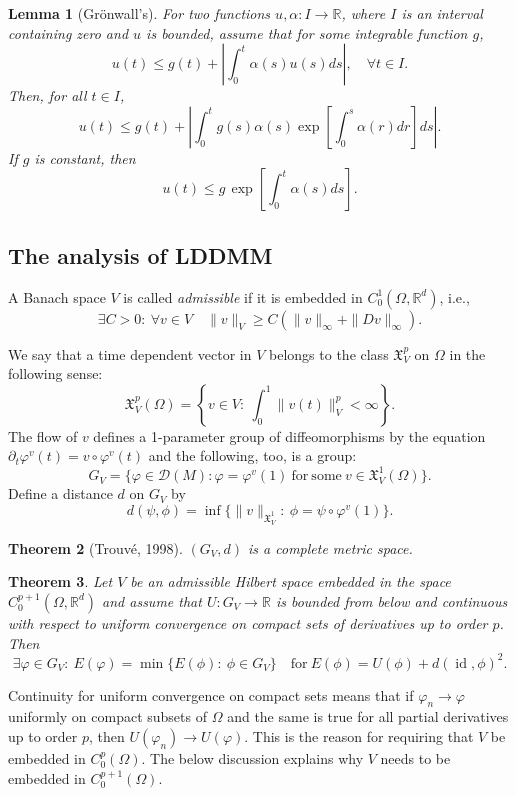 \documentclass[a5paper,10pt,twoside]{article}
\newcommand{\R}{\ensuremath{\mathbb{R}}}
\newcommand{\cD}{\ensuremath{\mathcal{D}}}
\newcommand{\X}{\ensuremath{\mathfrak{X}}}
\DeclareMathOperator*{\id}{id}
\theoremstyle{plain}
\newtheorem{teo}{Theorem}[section]
\newtheorem{lem}[teo]{Lemma}
\theoremstyle{definition}
\theoremstyle{remark}
\begin{document}
\begin{lem}[Grönwall's]
	\label{gronwalls}
	For two functions $u,\alpha:I\to \R$, where $I$ is an interval containing zero and $u$ is bounded, assume that for some integrable function $g$,
	\[
	u(t)\leq g(t)+\left|\int_0^t\alpha(s)u(s)ds\right|,\quad \forall t\in I.
	\]
	Then, for all $t\in I$,
	\[
	u(t)\leq g(t)+\left|\int_0^t g(s)\alpha(s)\exp[\int_0^s\alpha(r)dr]ds\right|.
	\]
	If $g$ is constant, then
	\[
	u(t)\leq g\,\exp\left[\int_0^t\alpha(s)ds\right].
	\]
\end{lem}

\subsection{The analysis of LDDMM}

A Banach space $V$ is called \textit{admissible} if it is embedded in $C_0^1(\Omega,\R^d)$, i.e., 
\[
	\exists C>0: \ \forall v\in V\quad \|v\|_V\geq C(\|v\|_\infty+\|Dv\|_\infty).
\]

We say that a time dependent vector in $V$ belongs to the class $\X_V^p$ on $\Omega$ in the following sense:
\[
\X_V^p(\Omega)=\left\{v\in V:\ \int_0^1\|v(t)\|_V^p<\infty\right\}.
\]
The flow of $v$ defines a 1-parameter group of diffeomorphisms by the equation $\partial_t\varphi^v(t)=v\circ\varphi^v(t)$ and the following, too, is a group:
\[
G_V=\{\varphi\in \cD(M): \varphi=\varphi^v(1)\ \mathrm{for\ some\ } v\in\X_V^1(\Omega)\}.
\]
Define a distance $d$ on $G_V$ by
\[
d(\psi,\phi)=\inf\{\|v\|_{\X_V^1}:\ \phi=\psi\circ\varphi^v(1)\}.
\]

\begin{teo}[Trouvé, 1998]
	$(G_V,d)$ is a complete metric space.
\end{teo}



\begin{teo}
	Let $V$ be an admissible Hilbert space embedded in the space $C_0^{p+1}(\Omega,\R^d)$ and assume that $U:G_V\to\R$ is bounded from below and continuous with respect to uniform convergence on compact sets of derivatives up to order $p$. Then
	\[
	\exists \varphi\in G_V:\ E(\varphi)=\min\{E(\phi):\ \phi\in G_V\}\quad \mathrm{for\ } E(\phi)=U(\phi)+d(\id,\phi)^2.
	\]
\end{teo}

Continuity for uniform convergence on compact sets means that if $\varphi_n\to\varphi$ uniformly on compact subsets of $\Omega$ and the same is true for all partial derivatives up to order $p$, then $U(\varphi_n)\to U(\varphi)$. This is the reason for requiring that $V$ be embedded in $C_0^p(\Omega)$. 
The below discussion explains why $V$ needs to be embedded in $C^{p+1}_0(\Omega)$.
\end{document}
